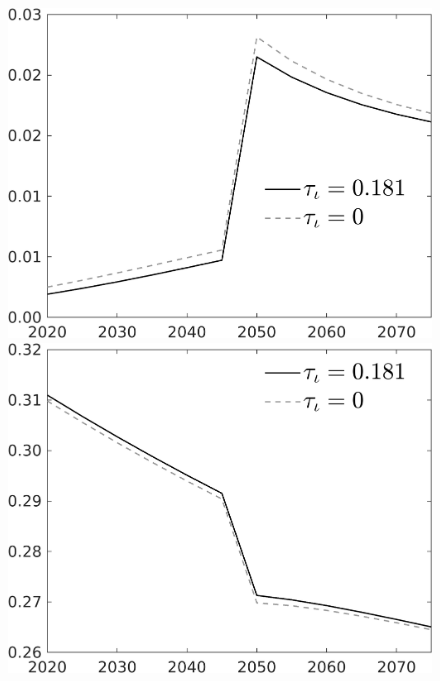 \begin{figure}[h!!]
\begin{minipage}[]{0.32\textwidth}
	\end{minipage}	
	\begin{minipage}[]{0.32\textwidth}
		\includegraphics[width=1\textwidth]{../../codding_model/own_basedOnFried/optimalPol_010922_revision/figures/all_13Sept22/CompTauf_bytaul_Reg0_sg_spillover0_nsk0_xgr0_knspil0_sep0_LFlimit1_emsbase0_countec0_GovRev0_etaa0.79_lgd1.png}
	\end{minipage}			
	\begin{minipage}[]{0.32\textwidth}
		\includegraphics[width=1\textwidth]{../../codding_model/own_basedOnFried/optimalPol_010922_revision/figures/all_13Sept22/CompTauf_bytaul_Reg0_sn_spillover0_nsk0_xgr0_knspil0_sep0_LFlimit1_emsbase0_countec0_GovRev0_etaa0.79_lgd1.png}

\end{minipage}
\end{figure}
